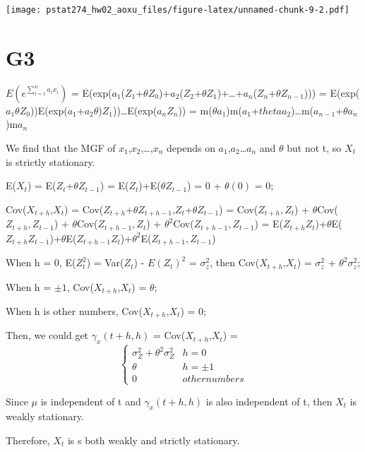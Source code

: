 \documentclass[
]{article}
\begin{document}
\texttt{[image: pstat274\_hw02\_aoxu\_files/figure-latex/unnamed-chunk-9-2.pdf]}

\hypertarget{g3}{%
\section{G3}\label{g3}}

\(E({e}^{\displaystyle \sum_{i=1}^{n}a_ix_i})\) =
E(exp(\(a_1\)(\(Z_1\)+\(\theta\)\(Z_0\))+\(a_2\)(\(Z_2\)+\(\theta\)\(Z_1\))+\ldots+\(a_n\)(\(Z_n\)+\(\theta\)\(Z_{n-1}\))))
=
E(exp(\(a_1\)\(\theta\)\(Z_0\)))E(exp(\(a_1\)+\(a_2\theta\))\(Z_1\)))\ldots E(exp(\(a_n\)\(Z_n\)))
=
m(\(\theta\)\(a_1\))m(\(a_1\)+\(theta\)\(a_2\))\ldots m(\(a_{n-1}\)+\(\theta\)\(a_n\))m\(a_n\)

We find that the MGF of \(x_1\),\(x_2\),\ldots,\(x_n\) depends on
\(a_1\),\(a_2\)\ldots{}\(a_n\) and \(\theta\) but not t, so \(X_t\) is
strictly stationary.

E(\(X_t\)) = E(\(Z_t\)+\(\theta\)\(Z_{t-1}\)) =
E(\(Z_t\))+E(\(\theta\)\(Z_{t-1}\)) = 0 + \(\theta(0)\) = 0;

Cov(\(X_{t+h}\),\(X_t\)) =
Cov(\(Z_{t+h}\)+\(\theta\)\(Z_{t+h-1}\),\(Z_{t}\)+\(\theta\)\(Z_{t-1}\))
= Cov(\(Z_{t+h},Z_t\)) + \(\theta\)Cov(\(Z_{t+h},Z_{t-1}\)) +
\(\theta\)Cov(\(Z_{t+h-1},Z_t\)) +
\(\theta^2\)Cov(\(Z_{t+h-1},Z_{t-1}\)) =
E(\(Z_{t+h}Z_{t}\))+\(\theta\)E(\(Z_{t+h}Z_{t-1}\))+\(\theta\)E(\(Z_{t+h-1}Z_{t}\))+\(\theta^2\)E(\(Z_{t+h-1},Z_{t-1}\))

When h = 0, E(\(Z_t^2\)) = Var(\(Z_t\)) - \(E(Z_t)^2\) = \(\sigma_z^2\),
then Cov(\(X_{t+h}\),\(X_t\)) = \(\sigma_z^2\) +
\(\theta^2\)\(\sigma_z^2\);

When h = \(\pm1\), Cov(\(X_{t+h}\),\(X_t\)) = \(\theta\);

When h is other numbers, Cov(\(X_{t+h}\),\(X_t\)) = 0;

Then, we could get \(\gamma_x(t+h,h)\) = Cov(\(X_{t+h}\),\(X_t\)) =\\
\[\begin{cases} 
  \sigma_Z^2 + \theta^2\sigma_Z^2 & h = 0\\ 
  \theta & h = \pm1\\
  0 & other numbers
\end{cases}\]

Since \(\mu\) is independent of t and \(\gamma_x(t+h,h)\) is also
independent of t, then \(X_t\) is weakly stationary.

Therefore, \(X_t\) is s both weakly and strictly stationary.
\end{document}
